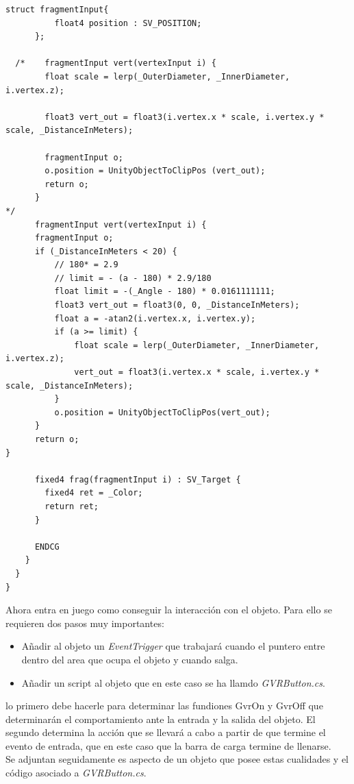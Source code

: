 \begin{lstlisting}[frame=single, caption={GvrReticleShader.shader}]
      struct fragmentInput{
          float4 position : SV_POSITION;
      };

  /*    fragmentInput vert(vertexInput i) {
        float scale = lerp(_OuterDiameter, _InnerDiameter, i.vertex.z);

        float3 vert_out = float3(i.vertex.x * scale, i.vertex.y * scale, _DistanceInMeters);

        fragmentInput o;
        o.position = UnityObjectToClipPos (vert_out);
        return o;
      }
*/
      fragmentInput vert(vertexInput i) {
	  fragmentInput o;
	  if (_DistanceInMeters < 20) {
		  // 180* = 2.9
		  // limit = - (a - 180) * 2.9/180
		  float limit = -(_Angle - 180) * 0.0161111111;
		  float3 vert_out = float3(0, 0, _DistanceInMeters);
		  float a = -atan2(i.vertex.x, i.vertex.y);
		  if (a >= limit) {
			  float scale = lerp(_OuterDiameter, _InnerDiameter, i.vertex.z);
			  vert_out = float3(i.vertex.x * scale, i.vertex.y * scale, _DistanceInMeters);
		  }
		  o.position = UnityObjectToClipPos(vert_out);
	  }
	  return o;
}

      fixed4 frag(fragmentInput i) : SV_Target {
        fixed4 ret = _Color;
        return ret;
      }

      ENDCG
    }
  }
}

\end{lstlisting}


\quad Ahora entra en juego como conseguir la interacción con el objeto. Para ello se requieren dos pasos muy importantes: \\

\begin{itemize}
	\item Añadir al objeto un \textit{EventTrigger} que trabajará cuando el puntero entre dentro del area que ocupa el objeto y cuando salga.
	\item Añadir un script al objeto que en este caso se ha llamdo \textit{GVRButton.cs}.
\end{itemize}

\quad lo primero debe hacerle para determinar las fundiones GvrOn y GvrOff que determinarán el comportamiento ante la entrada y la salida del objeto. El segundo determina la acción que se llevará a cabo a partir de que termine el evento de entrada, que en este caso que la barra de carga termine de llenarse.\\

\quad Se adjuntan seguidamente es aspecto de un objeto que posee estas cualidades y el código asociado a \textit{GVRButton.cs}.\\

